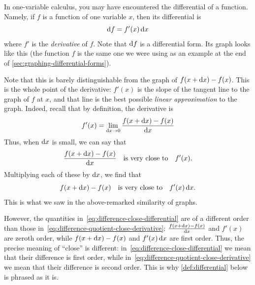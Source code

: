 In one-variable calculus, you may have encountered the differential of a function.
Namely, if $f$ is a function of one variable $x$, then its differential is
\begin{equation}
  {\ensuremath{\mathrm{d} f}} = f'(x) \, {\mathrm{d} x}\label{eq:onevariable-differential}
\end{equation}
where $f'$ is the \emph{derivative} of $f$.
Note that ${\mathrm{d} f}$ is a differential form.
Its graph looks like this (the function $f$ is the same one we were using as an example at the end of \cref{sec:graphing-differential-forms}).
\begin{center}
\end{center}
Note that this is barely distinguishable from the graph of $f(x+{\mathrm{d} x})-f(x)$.
This is the whole point of the derivative: $f'(x)$ is the slope of the tangent line to the graph of $f$ at $x$, and that line is the best possible \emph{linear approximation} to the graph.
Indeed, recall that by definition, the derivative is
\[ f'(x) = \lim_{{\mathrm{d} x}\to 0} \frac{f(x+{\mathrm{d} x})-f(x)}{{\mathrm{d} x}} \]
Thus, when ${\mathrm{d} x}$ is small, we can say that
\begin{equation}\label{eq:difference-quotient-close-derivative}
  \frac{f(x+{\mathrm{d} x})-f(x)}{{\mathrm{d} x}}\quad\text{is very close to}\quad f'(x).
\end{equation}
Multiplying each of these by ${\mathrm{d} x}$, we find that
\begin{equation}
  f(x+{\mathrm{d} x})-f(x) \quad\text{is very close to}\quad f'(x)\,{\mathrm{d} x}.\label{eq:difference-close-differential}
\end{equation}
This is what we saw in the above-remarked similarity of graphs.

\begin{adv}
  However, the quantities in~\cref{eq:difference-close-differential} are of a different order than those in~\cref{eq:difference-quotient-close-derivative}:
  $\frac{f(x+{\mathrm{d} x})-f(x)}{{\mathrm{d} x}}$ and $f'(x)$ are zeroth order, while $f(x+{\mathrm{d} x})-f(x)$ and $f'(x)\,{\mathrm{d} x}$ are first order.
  Thus, the precise meaning of ``close'' is different: in~\cref{eq:difference-close-differential} we mean that their difference is first order, while in~\cref{eq:difference-quotient-close-derivative} we mean that their difference is second order.
  This is why \cref{def:differential} below is phrased as it is.
\end{adv}

